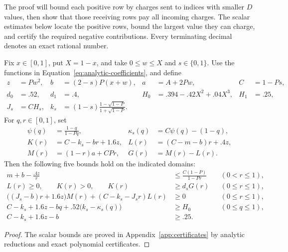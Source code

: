 The proof will bound each positive row by charges sent to indices with
smaller $D$ values, then show that those receiving rows pay all incoming
charges. The scalar estimates below locate the positive rows, bound the
largest value they can charge, and certify the required negative
contributions. Every terminating decimal denotes an exact rational number.

\begin{lemma}
\label{lem:scalar-bounds}
Fix $x\in[0,1]$, put $X=1-x$, and take
$0\le w\le X$ and $s\in\{0,1\}$.  Use the functions in
Equation~\eqref{eq:analytic-coefficients}, and define
\begin{equation}
\label{eq:scalar-parameters}
\begin{aligned}
 z&=Pw^2,& b&=(2-s)P(x+w),& a&=A+2Pw,& C&=1-Ps,\\
 d_0&=.52,& d_1&=.4,& H_0&=.394-.42X^2+.04X^3,& H_1&=.25,\\
 J_s&=CH_s,&
 k_s&=(1-s)\frac{1-\sqrt{1-P}}{1+\sqrt{1-P}}.
\end{aligned}
\end{equation}
For $q,r\in[0,1]$, set
\begin{equation}
\label{eq:scalar-functions}
\begin{aligned}
 \psi(q)&=\frac{1-q}{1-Pq},&
 \kappa_s(q)&=C\psi(q)-(1-q),\\
 K(r)&=C-k_s-br+1.6z,&
 L(r)&=(C-m-b)r+.4z,\\
 M(r)&=(1-r)a+CPr,& G(r)&=M(r)-L(r).
\end{aligned}
\end{equation}
Then the following five bounds hold on the indicated domains:
\begin{align}
 m+b-\frac{.4z}{r}
 &\le\frac{C(1-P)}{1-Pr}
 &&(0<r\le1),
 \label{eq:scalar-first}\\
 L(r)\ge0,\qquad K(r)>0,\qquad K(r)
 &\ge d_sG(r)
 &&(0\le r\le1),
 \label{eq:scalar-linear}\\
 \bigl((J_s-b)r+1.6z\bigr)M(r)
 +(C-k_s-J_sr)L(r)
 &\ge0
 &&(0\le r\le1),
 \label{eq:scalar-charge}\\
 C-k_s+1.6z-bq+.52\bigl(k_s-\kappa_s(q)\bigr)
 &\ge H_0
 &&(0\le q\le1),
 \label{eq:scalar-type-zero}\\
 C-k_s+1.6z-b&\ge.25.
 \label{eq:scalar-type-one}
\end{align}
\end{lemma}

\begin{proof}
The scalar bounds are proved in Appendix~\ref{app:certificates} by
analytic reductions and exact polynomial certificates.
\end{proof}

